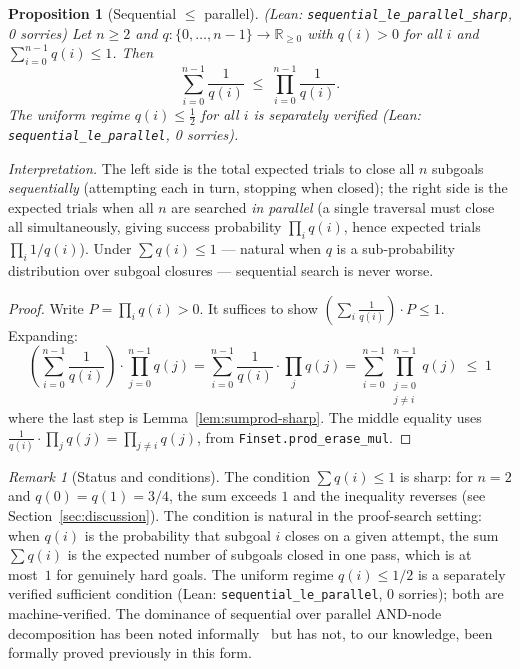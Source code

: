 \documentclass[reqno,11pt]{amsart}
\newcommand{\Rnn}{\mathbb{R}_{\ge 0}}
\newcommand{\leanverified}[1]{\textup{(Lean: \texttt{\small #1}, 0 sorries)}}
\theoremstyle{plain}
\newtheorem{proposition}[theorem]{Proposition}
\theoremstyle{definition}
\theoremstyle{remark}
\newtheorem{remark}[theorem]{Remark}
\begin{document}
\begin{proposition}[Sequential $\le$ parallel]\label{thm:seq}
\leanverified{sequential\_le\_parallel\_sharp}
Let $n \ge 2$ and $q : \{0,\ldots,n-1\} \to \Rnn$ with $q(i) > 0$ for all $i$ and $\sum_{i=0}^{n-1} q(i) \le 1$. Then
\[
\sum_{i=0}^{n-1} \frac{1}{q(i)} \;\le\; \prod_{i=0}^{n-1} \frac{1}{q(i)}.
\]
The uniform regime $q(i) \le \tfrac{1}{2}$ for all $i$ is separately verified \leanverified{sequential\_le\_parallel}.
\end{proposition}

\emph{Interpretation.} The left side is the total expected trials to close all $n$ subgoals \emph{sequentially} (attempting each in turn, stopping when closed); the right side is the expected trials when all $n$ are searched \emph{in parallel} (a single traversal must close all simultaneously, giving success probability $\prod_i q(i)$, hence expected trials $\prod_i 1/q(i)$). Under $\sum q(i) \le 1$ --- natural when $q$ is a sub-probability distribution over subgoal closures --- sequential search is never worse.

\begin{proof}
Write $P = \prod_i q(i) > 0$. It suffices to show $\left(\sum_i \tfrac{1}{q(i)}\right) \cdot P \le 1$. Expanding:
\[
\left(\sum_{i=0}^{n-1}\frac{1}{q(i)}\right)\cdot\prod_{j=0}^{n-1}q(j)
= \sum_{i=0}^{n-1}\frac{1}{q(i)}\cdot\prod_j q(j)
= \sum_{i=0}^{n-1}\prod_{\substack{j=0\\j\ne i}}^{n-1}q(j)
\;\le\; 1
\]
where the last step is Lemma~\ref{lem:sumprod-sharp}. The middle equality uses $\tfrac{1}{q(i)}\cdot\prod_j q(j) = \prod_{j\ne i} q(j)$, from \texttt{Finset.prod\_erase\_mul}.
\end{proof}

\begin{remark}[Status and conditions]
The condition $\sum q(i) \le 1$ is sharp: for $n = 2$ and $q(0) = q(1) = 3/4$, the sum exceeds $1$ and the inequality reverses (see Section~\ref{sec:discussion}). The condition is natural in the proof-search setting: when $q(i)$ is the probability that subgoal $i$ closes on a given attempt, the sum $\sum q(i)$ is the expected number of subgoals closed in one pass, which is at most~$1$ for genuinely hard goals. The uniform regime $q(i) \le 1/2$ is a separately verified sufficient condition \leanverified{sequential\_le\_parallel}; both are machine-verified. The dominance of sequential over parallel AND-node decomposition has been noted informally~\citep{Gauthier2021} but has not, to our knowledge, been formally proved previously in this form.
\end{remark}
\end{document}
